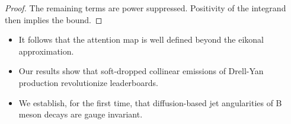 \begin{proof}
The remaining terms are power suppressed. Positivity of the integrand
then implies the bound.
\end{proof}

\begin{itemize}
  \item It follows that the attention map is well defined beyond the eikonal approximation.
  \item Our results show that soft-dropped collinear emissions of Drell-Yan production revolutionize leaderboards.
  \item We establish, for the first time, that diffusion-based jet angularities of B meson decays are gauge invariant.
\end{itemize}

